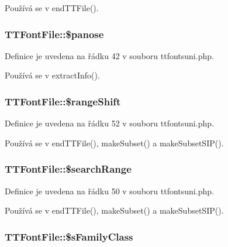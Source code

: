 Používá se v end\-T\-T\-File().

\hypertarget{class_t_t_font_file_a9952320e764dbf554bc2cb1c71ed1b35}{
\subsubsection[{\$panose}]{\setlength{\rightskip}{0pt plus 5cm}T\-T\-Font\-File\-::\$panose}}\label{class_t_t_font_file_a9952320e764dbf554bc2cb1c71ed1b35}


Definice je uvedena na řádku 42 v souboru ttfontsuni.\-php.



Používá se v extract\-Info().

\hypertarget{class_t_t_font_file_ae285f9718c9eee99cdac8c104467632b}{
\subsubsection[{\$range\-Shift}]{\setlength{\rightskip}{0pt plus 5cm}T\-T\-Font\-File\-::\$range\-Shift}}\label{class_t_t_font_file_ae285f9718c9eee99cdac8c104467632b}


Definice je uvedena na řádku 52 v souboru ttfontsuni.\-php.



Používá se v end\-T\-T\-File(), make\-Subset() a make\-Subset\-S\-I\-P().

\hypertarget{class_t_t_font_file_abcdee3ea5c88e52132578335b54b9bc1}{
\subsubsection[{\$search\-Range}]{\setlength{\rightskip}{0pt plus 5cm}T\-T\-Font\-File\-::\$search\-Range}}\label{class_t_t_font_file_abcdee3ea5c88e52132578335b54b9bc1}


Definice je uvedena na řádku 50 v souboru ttfontsuni.\-php.



Používá se v end\-T\-T\-File(), make\-Subset() a make\-Subset\-S\-I\-P().

\hypertarget{class_t_t_font_file_a6a12484724ba327081a2fcf5a93c79c0}{
\subsubsection[{\$s\-Family\-Class}]{\setlength{\rightskip}{0pt plus 5cm}T\-T\-Font\-File\-::\$s\-Family\-Class}}\label{class_t_t_font_file_a6a12484724ba327081a2fcf5a93c79c0}


